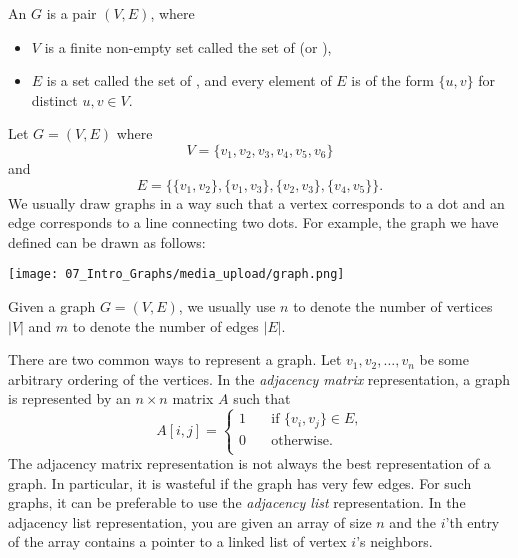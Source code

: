 \begin{flex}
\begin{definition} \label{definition:Undirected-graph}
An  $G$ is a pair $(V,E)$, where 
\begin{itemize}
    \item $V$ is a finite non-empty set called the set of  (or ),
    \item $E$ is a set called the set of , and every element of $E$ is of the form $\{u,v\}$ for distinct $u, v \in V$.
\end{itemize}
\end{definition}

\begin{example} \label{example:A-graph-with-6-vertices-and-4-edges}
Let $G=(V,E)$ where $$V = \{v_1,v_2,v_3,v_4,v_5,v_6\}$$ and $$E = \{\{v_1,v_2\},\{v_1,v_3\},\{v_2,v_3\},\{v_4,v_5\}\}.$$ We usually draw graphs in a way such that a vertex corresponds to a dot and an edge corresponds to a line connecting two dots. For example, the graph we have defined can be drawn as follows:
\begin{center}
    \texttt{[image: 07\_Intro\_Graphs/media\_upload/graph.png]}
\end{center} 
\end{example}
\end{flex}


\begin{note}[$n$ and $m$] \label{note:n-and-m}
Given a graph $G=(V,E)$, we usually use $n$ to denote the number of vertices $|V|$ and $m$ to denote the number of edges $|E|$.
\end{note}


\begin{important} \label{important:Representations-of-graphs}
There are two common ways to represent a graph. Let $v_1,v_2,\ldots,v_n$ be some arbitrary ordering of the vertices. In the \emph{adjacency matrix} representation, a graph is represented by an $n \times n$ matrix $A$ such that
\[ A[i,j] =
  \begin{cases}
    1  & \quad \text{if $\{v_i,v_j\} \in E$,}\\
    0  & \quad \text{otherwise.}\\
  \end{cases}
\]
The adjacency matrix representation is not always the best representation of a graph. In particular, it is wasteful if the graph has very few edges. For such graphs, it can be preferable to use the \emph{adjacency list} representation. In the adjacency list representation, you are given an array of size $n$ and the $i$'th entry of the array contains a pointer to a linked list of vertex $i$'s neighbors.
\end{important}


